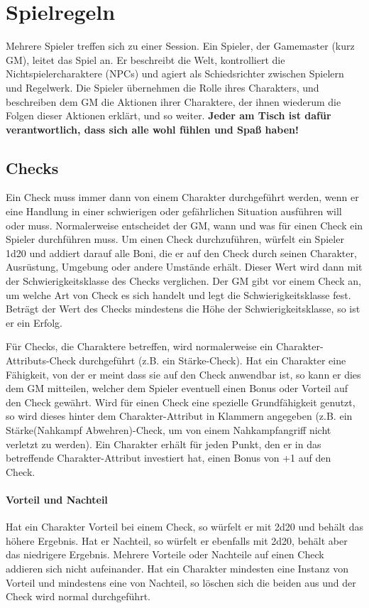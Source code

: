 \chapter{Spielregeln}
Mehrere Spieler treffen sich zu einer Session. Ein Spieler, der Gamemaster (kurz GM), leitet das Spiel an. Er beschreibt die Welt, kontrolliert die Nichtspielercharaktere (NPCs) und agiert als Schiedsrichter zwischen Spielern und Regelwerk. Die Spieler übernehmen die Rolle ihres Charakters, und beschreiben dem GM die Aktionen ihrer Charaktere, der ihnen wiederum die Folgen dieser Aktionen erklärt, und so weiter.
\textbf{Jeder am Tisch ist dafür verantwortlich, dass sich alle wohl fühlen und Spaß haben!}
\section{Checks}
Ein Check muss immer dann von einem Charakter durchgeführt werden, wenn er eine Handlung in einer schwierigen oder gefährlichen Situation ausführen will oder muss. Normalerweise entscheidet der GM, wann und was für einen Check ein Spieler durchführen muss. Um einen Check durchzuführen, würfelt ein Spieler 1d20 und addiert darauf alle Boni, die er auf den Check durch seinen Charakter, Ausrüstung, Umgebung oder andere Umstände erhält. Dieser Wert wird dann mit der Schwierigkeitsklasse des Checks verglichen. Der GM gibt vor einem Check an, um welche Art von Check es sich handelt und legt die Schwierigkeitsklasse fest. Beträgt der Wert des Checks mindestens die Höhe der Schwierigkeitsklasse, so ist er ein Erfolg.

Für Checks, die Charaktere betreffen, wird normalerweise ein Charakter-Attributs-Check durchgeführt (z.B. ein Stärke-Check). Hat ein Charakter eine Fähigkeit, von der er meint dass sie auf den Check anwendbar ist, so kann er dies dem GM mitteilen, welcher dem Spieler eventuell einen Bonus oder Vorteil auf den Check gewährt. Wird für einen Check eine spezielle Grundfähigkeit genutzt, so wird dieses hinter dem Charakter-Attribut in Klammern angegeben (z.B. ein Stärke(Nahkampf Abwehren)-Check, um von einem Nahkampfangriff nicht verletzt zu werden). Ein Charakter erhält für jeden Punkt, den er in das betreffende Charakter-Attribut investiert hat, einen Bonus von +1 auf den Check.
\subsubsection{Vorteil und Nachteil}
Hat ein Charakter Vorteil bei einem Check, so würfelt er mit 2d20 und behält das höhere Ergebnis. Hat er Nachteil, so würfelt er ebenfalls mit 2d20, behält aber das niedrigere Ergebnis. Mehrere Vorteile oder Nachteile auf einen Check addieren sich nicht aufeinander. Hat ein Charakter mindesten eine Instanz von Vorteil und mindestens eine von Nachteil, so löschen sich die beiden aus und der Check wird normal durchgeführt.
